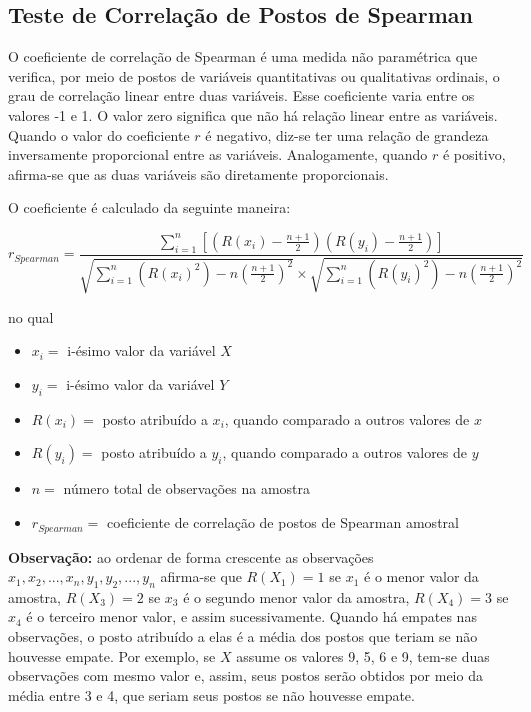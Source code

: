 \documentclass[
]{estat/estat}
\providecommand{\tightlist}{%
  \setlength{\itemsep}{0pt}\setlength{\parskip}{0pt}}\usepackage{longtable,booktabs,array}
\begin{document}
\hypertarget{teste-de-correlauxe7uxe3o-de-postos-de-spearman}{%
\subsection{Teste de Correlação de Postos de
Spearman}\label{teste-de-correlauxe7uxe3o-de-postos-de-spearman}}

O coeficiente de correlação de Spearman é uma medida não paramétrica que
verifica, por meio de postos de variáveis quantitativas ou qualitativas
ordinais, o grau de correlação linear entre duas variáveis. Esse
coeficiente varia entre os valores -1 e 1. O valor zero significa que
não há relação linear entre as variáveis. Quando o valor do coeficiente
\(r\) é negativo, diz-se ter uma relação de grandeza inversamente
proporcional entre as variáveis. Analogamente, quando \(r\) é positivo,
afirma-se que as duas variáveis são diretamente proporcionais.

O coeficiente é calculado da seguinte maneira:

\[
r_{Spearman} = \frac{ \displaystyle \sum_{i=1}^{n}  \left[\left(R(x_i)-\frac{n+1}{2}\right)\left(R(y_i)-\frac{n+1}{2}\right)\right]}
{\sqrt{\displaystyle \sum_{i=1}^{n}  \left(R(x_i)^2\right)-n\left(\frac{n+1}{2}\right)^{2}}  \times \sqrt{\displaystyle \sum_{i=1}^{n}  \left(R(y_i)^2 \right) -n\left(\frac{n+1}{2}\right)^{2}}}
\]

no qual

\begin{itemize}
\tightlist
\item
  \(x_i=\) i-ésimo valor da variável \(X\)
\item
  \(y_i=\) i-ésimo valor da variável \(Y\)
\item
  \(R(x_i)=\) posto atribuído a \(x_{i}\), quando comparado a outros
  valores de \(x\)
\item
  \(R(y_i)=\) posto atribuído a \(y_{i}\), quando comparado a outros
  valores de \(y\)
\item
  \(n=\) número total de observações na amostra
\item
  \(r_{Spearman}=\) coeficiente de correlação de postos de Spearman
  amostral
\end{itemize}

\textbf{Observação:} ao ordenar de forma crescente as observações
\(x_1,x_2,...,x_n,y_1,y_2,...,y_n\) afirma-se que \(R(X_1)=1\) se
\(x_1\) é o menor valor da amostra, \(R(X_3)=2\) se \(x_3\) é o segundo
menor valor da amostra, \(R(X_4)=3\) se \(x_4\) é o terceiro menor
valor, e assim sucessivamente. Quando há empates nas observações, o
posto atribuído a elas é a média dos postos que teriam se não houvesse
empate. Por exemplo, se \(X\) assume os valores 9, 5, 6 e 9, tem-se duas
observações com mesmo valor e, assim, seus postos serão obtidos por meio
da média entre 3 e 4, que seriam seus postos se não houvesse empate.
\end{document}
